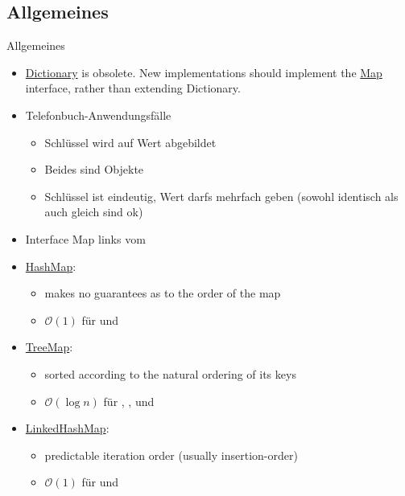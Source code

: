 \documentclass[usepdftitle=false,hyperref={pdfpagelabels=false}]{beamer}
\begin{document}
\subsection{Allgemeines}
\begin{frame}{Allgemeines}
    \begin{itemize}[<+->]
        \item \href{http://docs.oracle.com/javase/7/docs/api/java/util/Dictionary.html}{Dictionary} 
              is obsolete. New implementations should implement the 
              \href{http://docs.oracle.com/javase/7/docs/api/java/util/Map.html}{Map} 
              interface, rather than extending Dictionary.
        \item Telefonbuch-Anwendungsfälle
            \begin{itemize}
                \item Schlüssel wird auf Wert abgebildet
                \item Beides sind Objekte
                \item Schlüssel ist eindeutig, Wert darfs mehrfach geben (sowohl identisch als auch gleich sind ok)
            \end{itemize}
        \item Interface Map links vom \myCode{=}
        \item \href{http://docs.oracle.com/javase/7/docs/api/java/util/HashMap.html}{HashMap}: 
            \begin{itemize}
                \item makes no guarantees as to the order of the map
                \item $\mathcal{O}(1)$ für  und 
            \end{itemize}
        \item \href{http://docs.oracle.com/javase/7/docs/api/java/util/TreeMap.html}{TreeMap}: 
            \begin{itemize}
                \item sorted according to the natural ordering of its keys
                \item $\mathcal{O}(\log n)$ für , ,  und 
            \end{itemize}
        \item \href{http://docs.oracle.com/javase/7/docs/api/java/util/LinkedHashMap.html}{LinkedHashMap}:
            \begin{itemize}
                \item predictable iteration order (usually insertion-order)
                \item $\mathcal{O}(1)$ für  und 
            \end{itemize}
    \end{itemize}
\end{frame}
\end{document}
